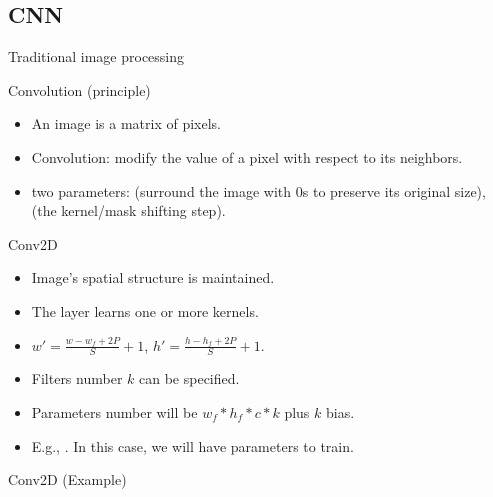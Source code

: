 \documentclass{KBook}
\begin{document}
\subsection{CNN}

Traditional image processing
	
	\begin{center}
	\end{center}
	
Convolution (principle)
	
	\begin{itemize}
		\item An image is a matrix of pixels.
		\item Convolution: modify the value of a pixel with respect to its neighbors.
		\item two parameters:  (surround the image with 0s to preserve its original size),  (the kernel/mask shifting step).
	\end{itemize}
	
	\begin{center}
	\end{center}
	
Conv2D
	
	\begin{minipage}{0.60\textwidth} 
		\begin{itemize}
			\item Image's spatial structure is maintained.
			\item The layer learns one or more kernels.
			\item $ w' = \frac{w - w_f + 2P}{S} + 1$,  $ h' = \frac{h - h_f + 2P}{S} + 1$.
			\item Filters number $k$ can be specified.
			\item Parameters number will be $w_f * h_f * c * k$ plus $k$ bias.
			\item E.g., . In this case, we will have  parameters to train.
		\end{itemize}
	\end{minipage}
	\begin{minipage}{0.39\textwidth}
	\end{minipage}
	
Conv2D (Example)
	
	\begin{center}
		\vskip-6pt
	\end{center}\vskip-16pt
	
\end{document}
